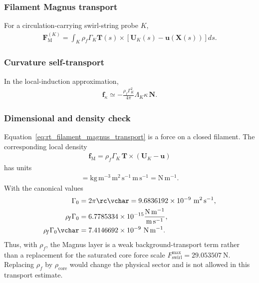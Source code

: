 \subsubsection{Filament Magnus transport}
    For a circulation-carrying swirl-string probe $K$,
    \begin{align}
        \mathbf{F}_{\mathrm{M}}^{(K)}
        =
        \int_K
        \rho_{\!f}\Gamma_K
        \mathbf{T}(s)\times
        \left[
            \mathbf{U}_K(s)-\mathbf{u}(\mathbf{X}(s))
        \right]ds.
        \label{eq:rt_filament_magnus_transport}
    \end{align}

\subsubsection{Curvature self-transport}
    In the local-induction approximation,
    \begin{align}
        \mathbf{f}_{\kappa}
        \simeq
        -\frac{\rho_{\!f}\Gamma_K^2}{4\pi}
        \Lambda_K\kappa\,\mathbf{N}.
        \label{eq:rt_curvature_self_transport}
    \end{align}

\subsubsection{Dimensional and density check}
    Equation~\eqref{eq:rt_filament_magnus_transport} is a force on a closed
    filament. The corresponding local density
    \begin{align}
        \mathbf{f}_{\mathrm{M}}
        =
        \rho_{\!f}\Gamma_K\,
        \mathbf{T}\times(\mathbf{U}_K-\mathbf{u})
    \end{align}
    has units
    \begin{align}
        [\rho_{\!f}\Gamma_K\Delta U]
        =
        \mathrm{kg\,m^{-3}}\,\mathrm{m^2\,s^{-1}}\,\mathrm{m\,s^{-1}}
        =
        \mathrm{N\,m^{-1}}.
    \end{align}
    With the canonical values
    \begin{align}
        \Gamma_0
        &=
        2\pi \rc\vchar
        =
        9.6836192\times10^{-9}\ \mathrm{m^2\,s^{-1}},\\
        \rho_{\!f}\Gamma_0
        &=
        6.7785334\times10^{-15}
        \frac{\mathrm{N\,m^{-1}}}{\mathrm{m\,s^{-1}}},\\
        \rho_{\!f}\Gamma_0\vchar
        &=
        7.4146692\times10^{-9}\ \mathrm{N\,m^{-1}}.
    \end{align}
    Thus, with \(\rho_{\!f}\), the Magnus layer is a weak background-transport
    term rather than a replacement for the saturated core force scale
    \(F_{\mathrm{swirl}}^{\max}=29.053507\ \mathrm{N}\). Replacing
    \(\rho_{\!f}\) by \(\rho_{\mathrm{core}}\) would change the physical sector and
    is not allowed in this transport estimate.

